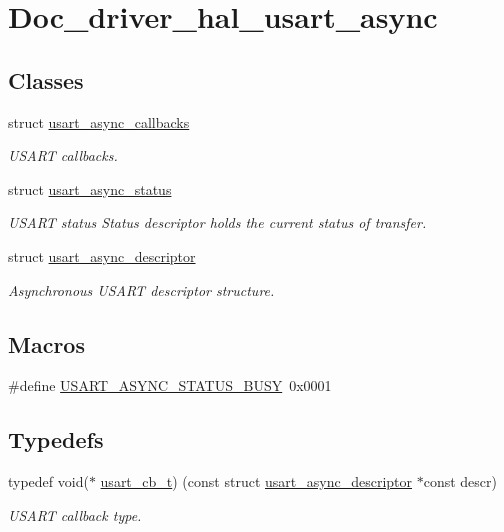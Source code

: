 \hypertarget{group__doc__driver__hal__usart__async}{}\section{Doc\+\_\+driver\+\_\+hal\+\_\+usart\+\_\+async}
\label{group__doc__driver__hal__usart__async}
\subsection*{Classes}
\begin{DoxyCompactItemize}
\item 
struct \hyperlink{structusart__async__callbacks}{usart\+\_\+async\+\_\+callbacks}
\begin{DoxyCompactList}\small\item\em U\+S\+A\+RT callbacks. \end{DoxyCompactList}\item 
struct \hyperlink{structusart__async__status}{usart\+\_\+async\+\_\+status}
\begin{DoxyCompactList}\small\item\em U\+S\+A\+RT status Status descriptor holds the current status of transfer. \end{DoxyCompactList}\item 
struct \hyperlink{structusart__async__descriptor}{usart\+\_\+async\+\_\+descriptor}
\begin{DoxyCompactList}\small\item\em Asynchronous U\+S\+A\+RT descriptor structure. \end{DoxyCompactList}\end{DoxyCompactItemize}
\subsection*{Macros}
\begin{DoxyCompactItemize}
\item 
\#define \hyperlink{group__doc__driver__hal__usart__async_ga6991341cd882eb58bccc1de667d1b336}{U\+S\+A\+R\+T\+\_\+\+A\+S\+Y\+N\+C\+\_\+\+S\+T\+A\+T\+U\+S\+\_\+\+B\+U\+SY}~0x0001
\end{DoxyCompactItemize}
\subsection*{Typedefs}
\begin{DoxyCompactItemize}
\item 
\mbox{\label{group__doc__driver__hal__usart__async_ga430e4080a53e1f39c4d46da01200f633}} 
typedef void($\ast$ \hyperlink{group__doc__driver__hal__usart__async_ga430e4080a53e1f39c4d46da01200f633}{usart\+\_\+cb\+\_\+t}) (const struct \hyperlink{structusart__async__descriptor}{usart\+\_\+async\+\_\+descriptor} $\ast$const descr)
\begin{DoxyCompactList}\small\item\em U\+S\+A\+RT callback type. \end{DoxyCompactList}\end{DoxyCompactItemize}
